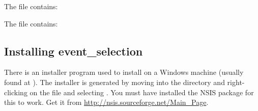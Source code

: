\documentclass{manual}
\begin{document}
\pagebreak

The  file contains:

\begin{figure}[ht]
  \centerline{}
  \label{fig:event7}
\end{figure}

The  file contains:

\begin{figure}[ht]
  \centerline{}
  \label{fig:event8}
\end{figure}

\subsection{Installing event_selection}
\label{subsubsec:event_selection_install}

There is an installer program used to install  on a Windows machine (usually found at 
).
The installer is generated by  moving into the  directory and right-clicking
on the  file and selecting .  You must have
installed the NSIS package for this to work.  Get it from \url{http://nsis.sourceforge.net/Main_Page}.
\end{document}
